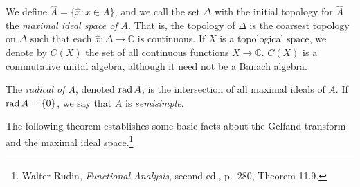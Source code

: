 \documentclass{article}
\newcommand{\rad}{\ensuremath\mathrm{rad}\,}
\theoremstyle{definition}
\theoremstyle{definition}
\begin{document}
We define $\widehat{A}=\{\hat{x}:x \in A\}$, and we call the set $\Delta$ with the initial topology for $\widehat{A}$ the {\em maximal ideal space of $A$}. That is,
the topology of $\Delta$ is the coarsest topology on $\Delta$ such that each $\hat{x}:\Delta \to \mathbb{C}$ is continuous. 
If $X$ is a topological space, we denote by $C(X)$ the set of all continuous functions $X \to \mathbb{C}$. $C(X)$ is a commutative unital algebra, although it need not be a Banach algebra.

The {\em radical of $A$}, denoted $\rad A$, is the intersection of all maximal ideals of $A$. If $\rad A= \{0\}$, we say that $A$ is {\em semisimple}.


The following theorem establishes some basic facts about the Gelfand transform and the maximal ideal space.\footnote{Walter
Rudin, {\em Functional Analysis}, second ed., p.~280, Theorem 11.9.}
\end{document}
